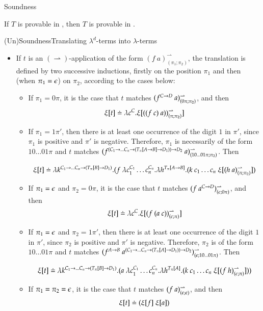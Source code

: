 \documentclass[9pt]{beamer}
\begin{document}
\begin{frame}{Soundness}

\begin{theorem}[Soundness]
\label{theorem:Soundness}
If $T$ is provable in \NDd, then $T$ is provable in \ND.
\end{theorem}
\end{frame}


\begin{frame}{(Un)Soundness}{Translating $\lambda^d$-terms into $\lambda$-terms}

\begin{itemize}
\item If $t$ is an $(\rightharpoonup)$-application of the form $(f \ a)^{\rightharpoonup}_{(\pi_1;\pi_2)}$, the translation is defined by two successive inductions, firstly on the position $\pi_1$ and then (when $\pi_1 = \epsilon$) on $\pi_2$, according to the cases below:
	\begin{itemize}
	\item If $\pi_1 = 0\pi$, it is the case that $t$ matches $(f^{C \imp D} \ a)^{\rightharpoonup}_{(0\pi;\pi_2)}$, and then
	$$\tP{t} \defEq \lambda c^C. \tP{((f \ c) \ a))^{\rightharpoonup}_{(\pi;\pi_2)}}$$
	\item If $\pi_1 = 1\pi'$, then there is at least one occurrence of the digit $1$ in $\pi'$, since $\pi_1$ is positive and $\pi'$ is negative. Therefore, $\pi_1$ is necessarily of the form $10\ldots01\pi$ and $t$ matches $(f^{(C_1 \imp \ldots C_n \imp (T_{\pi}[A \imp B] \imp D_1)) \imp D_2} \ a)^{\rightharpoonup}_{(10\ldots01\pi;\pi_2)}$. Then
	\begin{scriptsize}
	$$\tP{t} \defEq \lambda k^{C_1 \imp \ldots C_n \imp (T_{\pi}[B] \imp D_1)}. (f \ \lambda c_1^{C_1} \ldots c_n^{C_n}. \lambda h^{T_{\pi}[A \imp B]}. (k \ c_1 \ldots c_n \ \tP{(h \ a)^{\rightharpoonup}_{(\pi;\pi_2)}})$$
	\end{scriptsize}
	\item If $\pi_1 = \epsilon$ and $\pi_2 = 0\pi$, it is the case that $t$ matches $(f \ a^{C \rightarrow D})^{\rightharpoonup}_{(\epsilon;0\pi)}$, and then
	$$\tP{t} \defEq \lambda c^C. \tP{(f \ (a \ c))^{\rightharpoonup}_{(\eS;\pi)}}$$
	\item  If $\pi_1 = \epsilon$ and $\pi_2 = 1\pi'$, then there is at least one occurrence of the digit $1$ in $\pi'$, since $\pi_2$ is positive and $\pi'$ is negative. Therefore, $\pi_2$ is of the form $10\ldots01\pi$ and $t$ matches $(f^{A \rightarrow B} \ a^{(C_1 \rightarrow \ldots C_n \rightarrow (T_{\pi}[A] \rightarrow D_1))\rightarrow D_2})^{\rightharpoonup}_{(\epsilon;10\ldots01\pi)}$. Then
	\begin{scriptsize}
	$$\tP{t} \defEq \lambda k^{C_1 \imp \ldots C_n \imp (T_{\pi}[B] \imp D_1)}. (a \ \lambda c_1^{C_1} \ldots c_n^{C_n}. \lambda h^{T_{\pi}[A]}. (k \ c_1 \ldots c_n \ \tP{(f \ h)^{\rightharpoonup}_{(\eS;\pi)}}))$$
	\end{scriptsize}
	\item If $\pi_1 = \pi_2 = \epsilon$, it is the case that $t$ matches $(f \ a)^{\rightharpoonup}_{(\eS;\eS)}$, and then
	$$\xi[t] \doteq (\xi[f] \ \xi[a])$$
	\end{itemize}
\end{itemize}
\end{frame}
\end{document}

